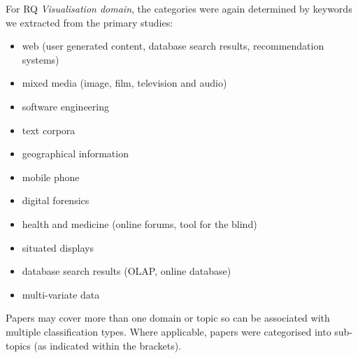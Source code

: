 For RQ \textit{Visualisation domain}, the categories were again determined by keywords we extracted from the primary studies:

\begin{itemize}
\item web (user generated content, database search results, recommendation systems)
\item mixed media (image, film, television and audio)
\item software engineering
\item text corpora
\item geographical information
\item mobile phone
\item digital forensics
\item health and medicine (online forums, tool for the blind)
\item situated displays
\item database search results (OLAP, online database)
\item multi-variate data
\end{itemize}

Papers may cover more than one domain or topic so can be associated with multiple classification types. Where applicable, papers were categorised into sub-topics (as indicated within the brackets).
